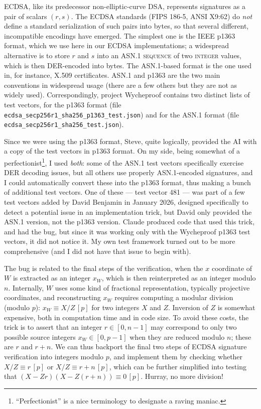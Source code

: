 \documentclass{llncs}
\newcommand{\eqvm}[3]{#1 \equiv #2 \,[#3]}
\begin{document}
ECDSA, like its predecessor non-elliptic-curve DSA, represents
signatures as a pair of scalars $(r,s)$. The ECDSA standards (FIPS
186-5, ANSI X9:62) do \emph{not} define a standard serialization of such
pairs into bytes, so that several different, incompatible encodings have
emerged. The simplest one is the IEEE p1363 format, which we use here in
our ECDSA implementations; a widespread alternative is to store $r$ and
$s$ into an ASN.1 \textsc{sequence} of two \textsc{integer} values,
which is then DER-encoded into bytes. The ASN.1-based format is the one
used in, for instance, X.509 certificates. ASN.1 and p1363 are the two
main conventions in widespread usage (there are a few others but they
are not as widely used). Correspondingly, project Wycheproof contains
two distinct lists of test vectors, for the p1363 format (file
\texttt{\small ecdsa\_secp256r1\_sha256\_p1363\_test.json}) and for the
ASN.1 format (file \texttt{\small ecdsa\_secp256r1\_sha256\_test.json}).

Since we were using the p1363 format, Steve, quite logically, provided
the AI with a copy of the test vectors in p1363 format. On my side,
being somewhat of a perfectionist\footnote{``Perfectionist'' is a nice
terminology to designate a raving maniac.}, I used \emph{both}: some of
the ASN.1 test vectors specifically exercise DER decoding issues, but
all others use properly ASN.1-encoded signatures, and I could
automatically convert these into the p1363 format, thus making a bunch
of additional test vectors. One of these --- test vector 481 --- was part
of a few test vectors added by David Benjamin in January 2026, designed
specifically to detect a potential issue in an implementation trick, but
David only provided the ASN.1 version, not the p1363 version. Claude
produced code that used this trick, and had the bug, but since it was
working only with the Wycheproof p1363 test vectors, it did not notice
it. My own test framework turned out to be more comprehensive (and I did
not have that issue to begin with).

The bug is related to the final steps of the verification, when the $x$
coordinate of $W$ is extracted as an integer $x_W$, which is then
reinterpreted as an integer modulo $n$. Internally, $W$ uses some kind
of fractional representation, typically projective coordinates, and
reconstructing $x_W$ requires computing a modular division (modulo $p$):
$\eqvm{x_W}{X/Z}{p}$ for two integers $X$ and $Z$. Inversion of $Z$ is
somewhat expensive, both in computation time and in code size. To avoid
these costs, the trick is to assert that an integer $r\in [0, n-1]$ may
correspond to only two possible source integers $x_W\in [0, p-1]$ when
they are reduced modulo $n$; these are $r$ and $r + n$. We can thus
backport the final two steps of ECDSA signature verification into
integers modulo $p$, and implement them by checking whether
$\eqvm{X/Z}{r}{p}$ or $\eqvm{X/Z}{r + n}{p}$, which can be further
simplified into testing that $\eqvm{(X - Zr)(X - Z(r + n))}{0}{p}$.
Hurray, no more division!
\end{document}
